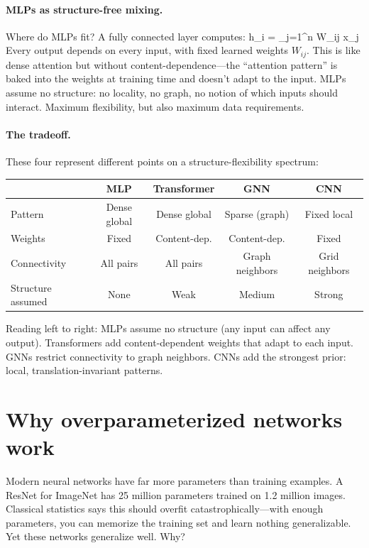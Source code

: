\documentclass[11pt]{article}
\begin{document}
\paragraph{MLPs as structure-free mixing.} Where do MLPs fit? A fully connected layer computes:
\beq
h_i = \sum_{j=1}^n W_{ij} \cdot x_j
\eeq
Every output depends on every input, with fixed learned weights $W_{ij}$. This is like dense attention but without content-dependence---the ``attention pattern'' is baked into the weights at training time and doesn't adapt to the input. MLPs assume no structure: no locality, no graph, no notion of which inputs should interact. Maximum flexibility, but also maximum data requirements.

\paragraph{The tradeoff.} These four represent different points on a structure-flexibility spectrum:

\begin{center}
\begin{tabular}{lcccc}
\toprule
& \textbf{MLP} & \textbf{Transformer} & \textbf{GNN} & \textbf{CNN} \\
\midrule
Pattern & Dense global & Dense global & Sparse (graph) & Fixed local \\
Weights & Fixed & Content-dep. & Content-dep. & Fixed \\
Connectivity & All pairs & All pairs & Graph neighbors & Grid neighbors \\
Structure assumed & None & Weak & Medium & Strong \\
\bottomrule
\end{tabular}
\end{center}

Reading left to right: MLPs assume no structure (any input can affect any output). Transformers add content-dependent weights that adapt to each input. GNNs restrict connectivity to graph neighbors. CNNs add the strongest prior: local, translation-invariant patterns.

\section{Why overparameterized networks work}

Modern neural networks have far more parameters than training examples. A ResNet for ImageNet has 25 million parameters trained on 1.2 million images. Classical statistics says this should overfit catastrophically---with enough parameters, you can memorize the training set and learn nothing generalizable. Yet these networks generalize well. Why?
\end{document}
